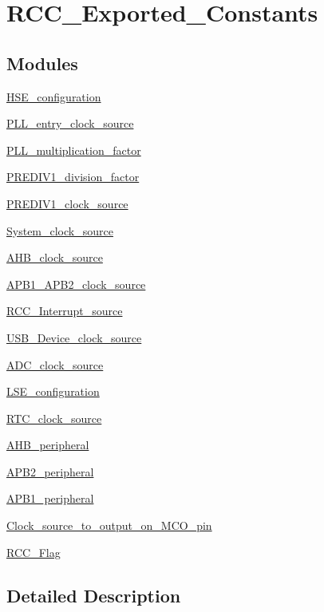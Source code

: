 \hypertarget{group___r_c_c___exported___constants}{}\section{R\+C\+C\+\_\+\+Exported\+\_\+\+Constants}
\label{group___r_c_c___exported___constants}
\subsection*{Modules}
\begin{DoxyCompactItemize}
\item 
\hyperlink{group___h_s_e__configuration}{H\+S\+E\+\_\+configuration}
\item 
\hyperlink{group___p_l_l__entry__clock__source}{P\+L\+L\+\_\+entry\+\_\+clock\+\_\+source}
\item 
\hyperlink{group___p_l_l__multiplication__factor}{P\+L\+L\+\_\+multiplication\+\_\+factor}
\item 
\hyperlink{group___p_r_e_d_i_v1__division__factor}{P\+R\+E\+D\+I\+V1\+\_\+division\+\_\+factor}
\item 
\hyperlink{group___p_r_e_d_i_v1__clock__source}{P\+R\+E\+D\+I\+V1\+\_\+clock\+\_\+source}
\item 
\hyperlink{group___system__clock__source}{System\+\_\+clock\+\_\+source}
\item 
\hyperlink{group___a_h_b__clock__source}{A\+H\+B\+\_\+clock\+\_\+source}
\item 
\hyperlink{group___a_p_b1___a_p_b2__clock__source}{A\+P\+B1\+\_\+\+A\+P\+B2\+\_\+clock\+\_\+source}
\item 
\hyperlink{group___r_c_c___interrupt__source}{R\+C\+C\+\_\+\+Interrupt\+\_\+source}
\item 
\hyperlink{group___u_s_b___device__clock__source}{U\+S\+B\+\_\+\+Device\+\_\+clock\+\_\+source}
\item 
\hyperlink{group___a_d_c__clock__source}{A\+D\+C\+\_\+clock\+\_\+source}
\item 
\hyperlink{group___l_s_e__configuration}{L\+S\+E\+\_\+configuration}
\item 
\hyperlink{group___r_t_c__clock__source}{R\+T\+C\+\_\+clock\+\_\+source}
\item 
\hyperlink{group___a_h_b__peripheral}{A\+H\+B\+\_\+peripheral}
\item 
\hyperlink{group___a_p_b2__peripheral}{A\+P\+B2\+\_\+peripheral}
\item 
\hyperlink{group___a_p_b1__peripheral}{A\+P\+B1\+\_\+peripheral}
\item 
\hyperlink{group___clock__source__to__output__on___m_c_o__pin}{Clock\+\_\+source\+\_\+to\+\_\+output\+\_\+on\+\_\+\+M\+C\+O\+\_\+pin}
\item 
\hyperlink{group___r_c_c___flag}{R\+C\+C\+\_\+\+Flag}
\end{DoxyCompactItemize}


\subsection{Detailed Description}
